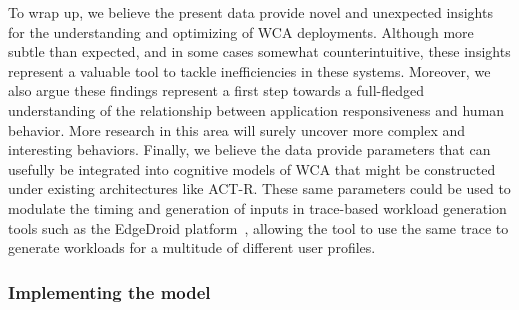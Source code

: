 To wrap up, we believe the present data provide novel and unexpected insights for the understanding and optimizing of WCA deployments.
Although more subtle than expected, and in some cases somewhat counterintuitive, these insights represent a valuable tool to tackle inefficiencies in these systems.
Moreover, we also argue these findings represent a first step towards a full-fledged understanding of the relationship between application responsiveness and human behavior.
More research in this area will surely uncover more complex and interesting behaviors.
Finally, we believe the data provide parameters that can usefully be integrated into cognitive models of WCA that might be constructed under existing architectures like ACT-R.
These same parameters could be used to modulate the timing and generation of inputs in trace-based workload generation tools such as the EdgeDroid platform~\cite{olguin:2018,olguin:2019}, allowing the tool to use the same trace to generate workloads for a multitude of different user profiles.

\subsubsection{Implementing the model}

